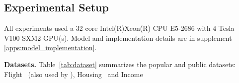 \subsection{Experimental Setup}
All experiments used a 32 core Intel(R)Xeon(R) CPU E5-2686 with 4 Tesla V100-SXM2 GPU(s). Model and implementation details are in supplement \ref{apps:model_implementation}.

\noindent\textbf{Datasets.}
%
Table~\ref{tab:dataset} summarizes the popular and public datasets: Flight~\cite{Flights} (also used by \cite{atena2020sigmod}), Housing~\cite{Housing} and Income~\cite{Income}
%
%




